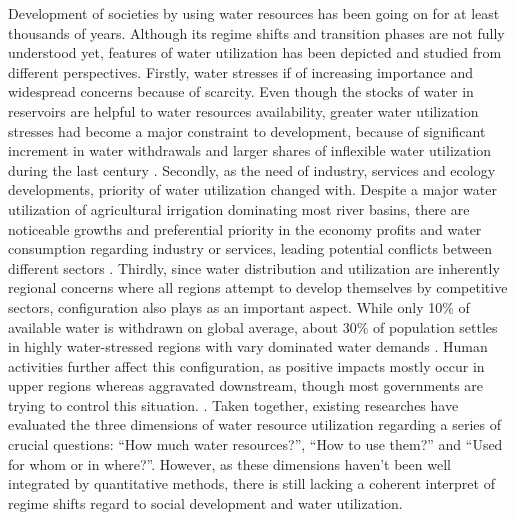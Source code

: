 \documentclass[9pt, twocolumn, twoside, lineno]{pnas-new}
\begin{document}
Development of societies by using water resources has been going on for at least thousands of years. Although its regime shifts and transition phases are not fully understood yet, features of water utilization has been depicted and studied from different perspectives.
Firstly, water stresses if of increasing importance and widespread concerns because of scarcity.
Even though the stocks of water in reservoirs are helpful to water resources availability, greater water utilization stresses had become a major constraint to development, because of significant increment in water withdrawals and larger shares of inflexible water utilization during the last century
\cite{postelHumanAppropriationRenewable1996, greveGlobalAssessmentWater2018, qinFlexibilityIntensityGlobal2019}.
Secondly, as the need of industry, services and ecology developments, priority of water utilization changed with. 
Despite a major water utilization of agricultural irrigation dominating most river basins, there are noticeable growths and preferential priority in the economy profits and water consumption regarding industry or services, leading potential conflicts between different sectors
\cite{liuWaterScarcityAssessments2017, florkeWaterCompetitionCities2018}.
Thirdly, since water distribution and utilization are inherently regional concerns where all regions attempt to develop themselves by competitive sectors, configuration also plays as an important aspect.
While only 10\% of available water is withdrawn on global average, about 30\% of population settles in highly water-stressed regions with vary dominated water demands
\cite{wadaWedgeApproachWater2014, okiGlobalHydrologicalCycles2006}.
Human activities further affect this configuration, as positive impacts mostly occur in upper regions whereas aggravated downstream, though most governments are trying to control this situation. 
\cite{veldkampWaterScarcityHotspots2017}. 
Taken together, existing researches have evaluated the three dimensions of water resource utilization regarding a series of crucial questions: “How much water resources?”, “How to use them?” and “Used for whom or in where?”.
However, as these dimensions haven't been well integrated by quantitative methods, there is still lacking a coherent interpret of regime shifts regard to social development and water utilization.
\end{document}
